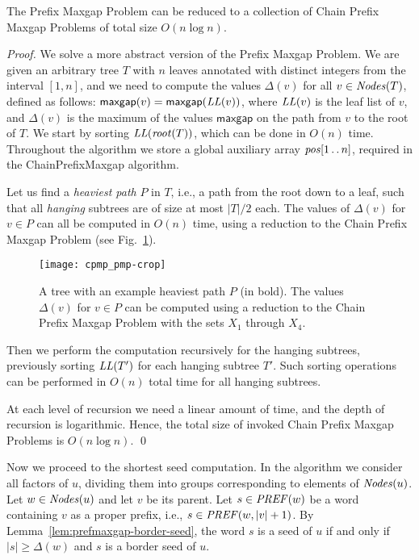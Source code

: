 \documentclass{llncs}
\newcommand{\Nodes}{\mbox{\textit{Nodes}}}
\newcommand{\LL}{\mbox{\textit{LL}}}
\newcommand{\maxgap}{\textsf{maxgap}}
\newcommand{\prefmaxgap}{\Delta}
\newcommand{\PREF}{\mbox{\textit{PREF}}}
\def\dotdot{\mathinner{\ldotp\ldotp}}
\begin{document}
 \begin{theorem}\label{thm:pmp}
   The Prefix Maxgap Problem can be reduced to a collection of Chain Prefix Maxgap Problems of total size $O(n \log n)$.
 \end{theorem}
 \begin{proof}
   We solve a more abstract version of the Prefix Maxgap Problem.
   We are given an arbitrary tree $T$ with $n$ leaves annotated with distinct
   integers from the interval $[1,n]$, and we need to compute the values $\prefmaxgap(v)$
   for all $v \in \Nodes(T)$, defined as follows:
   $\maxgap(v) = \maxgap(\LL(v))$, where $\LL(v)$ is the leaf list of $v$, and $\prefmaxgap(v)$
   is the maximum of the values $\maxgap$ on the path from $v$ to the root of $T$.
   We start by sorting $\LL(\mathit{root}(T))$, which can be done in $O(n)$ time.
   Throughout the algorithm we store a global auxiliary array $\mathit{pos}[1 \dotdot n]$,
   required in the ChainPrefixMaxgap algorithm.
   
   Let us find a \emph{heaviest path} $P$ in $T$, i.e., a path from the root down to a leaf, 
   such that all \emph{hanging} subtrees are of size at most $|T|/2$ each.
   The values of $\prefmaxgap(v)$ for $v\in P$ can all be computed in $O(n)$ time, using a reduction
   to the Chain Prefix Maxgap Problem (see Fig.~\ref{fig:cpmp_pmp}).
   
\begin{figure}
\begin{center}
\texttt{[image: cpmp\_pmp-crop]}
\end{center}
\caption{\label{fig:cpmp_pmp}
  A tree with an example heaviest path $P$ (in bold).
  The values $\prefmaxgap(v)$ for $v \in P$ can be computed using a reduction
  to the Chain Prefix Maxgap Problem with the sets $X_1$ through $X_4$.
}
\end{figure}
   
   Then we perform the computation recursively for the hanging subtrees, 
   previously sorting $\LL(T')$ for each hanging subtree $T'$.
   Such sorting operations can be performed in $O(n)$ total time for all hanging subtrees.

   At each level of recursion we need a linear amount of time, 
   and the depth of recursion is logarithmic.
   Hence, the total size of invoked Chain Prefix Maxgap Problems is $O(n\log n)$.
   \qed
 \end{proof}
    
    \noindent
    Now we proceed to the shortest seed computation.
    In the algorithm we consider all factors of $u$, dividing them into groups corresponding
    to elements of $\Nodes(u)$.
    Let $w \in \Nodes(u)$ and let $v$ be its parent.
    Let $s \in \PREF(w)$ be a word containing $v$ as a proper prefix, i.e., $s \in \PREF(w,|v|+1)$.
    By Lemma~\ref{lem:prefmaxgap-border-seed}, the word $s$ is a seed of $u$ if and only if
    $|s| \ge \prefmaxgap(w)$ and $s$ is a border seed of $u$.
   
\end{document}
